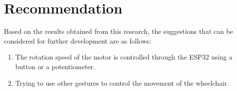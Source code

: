 \section{Recommendation}
\label{chap:saran}

Based on the results obtained from this research, the suggestions that can be considered for further development are as follows:

\begin{enumerate}

  \item The rotation speed of the motor is controlled through the ESP32 using a button or a potentiometer.

  \item Trying to use other gestures to control the movement of the wheelchair.

\end{enumerate}

